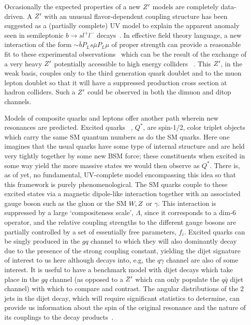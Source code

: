 \documentclass[a4paper,11pt]{article}
\begin{document}
Occasionally the expected properties of a new $Z^{\prime}$ models are completely data-driven.  A $Z^{\prime}$ with an unusual flavor-dependent coupling structure has been suggested as
a (partially complete) UV model to explain the apparent anomaly seen in semileptonic $b\rightarrow sl^+l^-$ decays~\cite{Aaij:2014ora,Aaij:2017vbb}. In effective field theory language,
a new interaction of the form $\sim \bar bP_Ls \bar \mu P_L \mu$ of proper strength can provide a reasonable fit to these experimental observations~\cite{Bifani:2018zmi} which can
be the result of the exchange of a
very heavy $Z^{\prime}$ potentially accessible to high energy colliders ~\cite{Allanach:2017bta}. This $Z^{\prime}$, in the weak basis, couples only to the third generation quark doublet and to the
muon lepton doublet so that it will have a suppressed production cross section at hadron colliders. Such a $Z^{\prime}$ could be observed in both the dimuon and ditop channels.

Models of composite quarks and leptons offer another path wherein new resonances are predicted. Excited quarks ~\cite{Baur:1987ga,Baur:1989kv}, $Q^*$, are spin-1/2, color triplet
objects which carry the same SM quantum numbers as do the SM quarks. Here one imagines that the usual quarks have some type of internal structure and are held very tightly together
by some new BSM force; these constituents when excited in some way yield the more massive states we would then observe as $Q^*$. There is, as of yet, no fundamental, UV-complete
model encompassing this idea so that this framework is purely phenomenological. The SM quarks couple to these excited states via a magnetic dipole-like interaction together with an associated gauge boson such as the gluon or the SM $W,Z$ or $\gamma$.  This interaction is suppressed by a large `compositeness scale', $\Lambda$, since it corresponds to a dim-6 operator, and the relative coupling strengths to the different gauge bosons are partially controlled by a set of essentially free parameters, $f_i$. Excited quarks can be singly produced in
the $gq$ channel to which they will also dominantly decay due to the presence of the strong coupling constant, yielding the dijet signature of interest to us here although decays into, e.g,
the $q\gamma$ channel are also of some interest. It is useful to have a benchmark model with dijet decays which take place in the $gq$ channel (as opposed to a $Z^{\prime}$ which can
only populate the $q\bar q$ dijet channel) with which to compare and contrast. The angular distributions of the 2 jets in the dijet decay, which will require significant statistics to
determine, can provide
us information about the spin of the original resonance and the nature of its couplings to the decay products~\cite{Harris:2011bh,Boelaert:2009jm,Chivukula:2014pma,Chivukula:2017nvl}.
\end{document}

